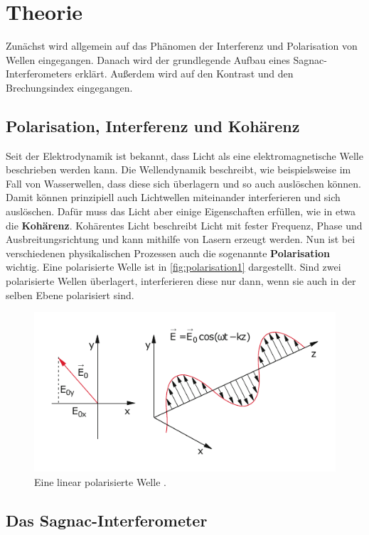 \section{Theorie}
\label{sec:Theorie}

Zunächst wird allgemein auf das Phänomen der Interferenz und Polarisation von Wellen eingegangen.
Danach wird der grundlegende Aufbau eines Sagnac-Interferometers erklärt.
Außerdem wird auf den Kontrast und den Brechungsindex eingegangen.

\subsection{Polarisation, Interferenz und Kohärenz} \label{sec:polarisation}
Seit der Elektrodynamik ist bekannt, dass Licht als eine elektromagnetische Welle beschrieben werden kann.
Die Wellendynamik beschreibt, wie beispielsweise im Fall von Wasserwellen, dass diese sich überlagern und so auch auslöschen können.
Damit können prinzipiell auch Lichtwellen miteinander interferieren und sich auslöschen.
Dafür muss das Licht aber einige Eigenschaften erfüllen, wie in etwa die \textbf{Kohärenz}.
Kohärentes Licht beschreibt Licht mit fester Frequenz, Phase und Ausbreitungsrichtung und kann mithilfe von Lasern erzeugt werden.
Nun ist bei verschiedenen physikalischen Prozessen auch die sogenannte \textbf{Polarisation} wichtig.
Eine polarisierte Welle ist in \autoref{fig:polarisation1} dargestellt.
Sind zwei polarisierte Wellen überlagert, interferieren diese nur dann, wenn sie auch in der selben Ebene polarisiert sind.

\begin{figure}
    \centering
    \includegraphics[width = 0.7 \linewidth]{pictures/polarisation1.pdf}
    \caption{Eine linear polarisierte Welle \cite{demtroeder2}.}
    \label{fig:polarisation1}
\end{figure}

\subsection{Das Sagnac-Interferometer} \label{sec:aufbau}

